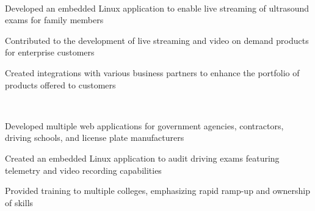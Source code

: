 \documentclass[a4paper]{MagicalCV}
\begin{document}
\begin{minipage}[t]{0.66\textwidth}
 \\
\vspace{\topsep} %
\begin{tightemize}
\item Developed an embedded Linux application to enable live streaming of ultrasound exams for family members
\item Contributed to the development of live streaming and video on demand products for enterprise customers
\item Created integrations with various business partners to enhance the portfolio of products offered to customers
\end{tightemize}
\sectionsep

 \\
\vspace{\topsep} %
\begin{tightemize}
\item Developed multiple web applications for government agencies, contractors, driving schools, and license plate manufacturers
\item Created an embedded Linux application to audit driving exams featuring telemetry and video recording capabilities
\item Provided training to multiple colleges, emphasizing rapid ramp-up and ownership of skills
\end{tightemize}
\sectionsep

 \\
\vspace{\topsep} %
\sectionsep

\end{minipage} 
\end{document}
